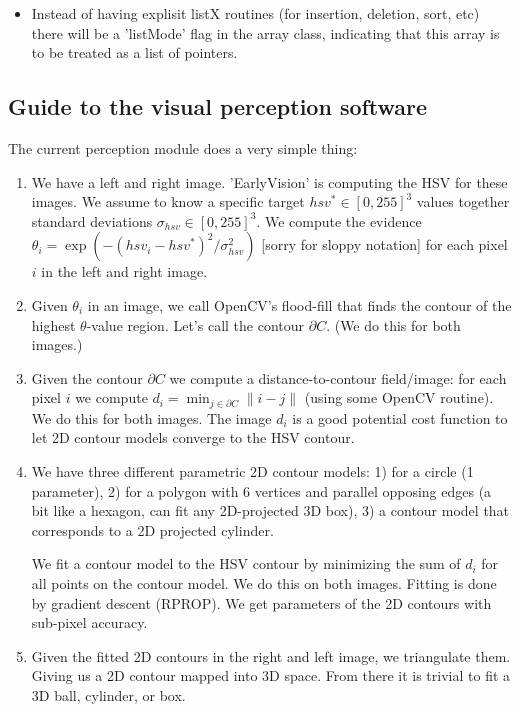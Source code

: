 \begin{itemize}
\item Instead of having explisit listX routines (for insertion, deletion,
   sort, etc) there will be a 'listMode' flag in the array class,
   indicating that this array is to be treated as a list of pointers.
\end{itemize}


\subsection{Guide to the visual perception software}

The current perception module does a very simple thing:
\begin{enumerate}
\item We have a left and right image. 'EarlyVision' is computing the
  HSV for these images. We assume to know a specific target $hsv^*\in[0,255]^3$
  values together standard deviations $\sigma_{hsv}\in[0,255]^3$. We compute
  the evidence $\theta_i = \exp(- (hsv_i-hsv^*)^2/\sigma_{hsv}^2)$ [sorry for
    sloppy notation] for each pixel $i$ in the left and right image.

\item Given $\theta_i$ in an image, we call OpenCV's flood-fill that finds
  the contour of the highest $\theta$-value region. Let's call the contour
  $\partial C$. (We do this for both images.)

\item Given the contour $\partial C$ we compute a distance-to-contour
  field/image: for each pixel $i$ we compute $d_i = \min_{j\in\partial C}
  \|i-j\|$ (using some OpenCV routine). We do this for both images. The
  image $d_i$ is a good potential cost function to let 2D contour
  models converge to the HSV contour.

\item We have three different parametric 2D contour models: 1) for a
  circle (1 parameter), 2) for a polygon with 6 vertices and parallel
  opposing edges (a bit like a hexagon, can fit any 2D-projected 3D
  box), 3) a contour model that corresponds to a 2D projected
  cylinder.

  We fit a contour model to the HSV contour by minimizing the sum of
  $d_i$ for all points on the contour model. We do this on both
  images. Fitting is done by gradient descent (RPROP). We get
  parameters of the 2D contours with sub-pixel accuracy.

\item Given the fitted 2D contours in the right and left image, we
  triangulate them. Giving us a 2D contour mapped into 3D space. From
  there it is trivial to fit a 3D ball, cylinder, or box.

\end{enumerate}

